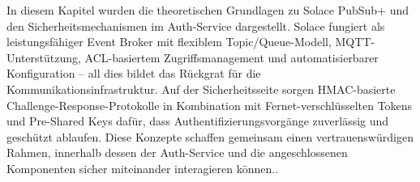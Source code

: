 In diesem Kapitel wurden die theoretischen Grundlagen zu Solace PubSub+ und den Sicherheitsmechanismen im Auth-Service dargestellt. Solace fungiert als leistungsfähiger Event Broker mit flexiblem Topic/Queue-Modell, MQTT-Unterstützung, ACL-basiertem Zugriffsmanagement und automatisierbarer Konfiguration – all dies bildet das Rückgrat für die Kommunikationsinfrastruktur. Auf der Sicherheitsseite sorgen HMAC-basierte Challenge-Response-Protokolle in Kombination mit Fernet-verschlüsselten Tokens und Pre-Shared Keys dafür, dass Authentifizierungsvorgänge zuverlässig und geschützt ablaufen. Diese Konzepte schaffen gemeinsam einen vertrauenswürdigen Rahmen, innerhalb dessen der Auth-Service und die angeschlossenen Komponenten sicher miteinander interagieren können..
